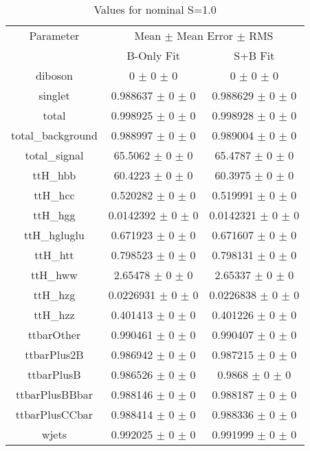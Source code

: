\begin{table}
\centering
\caption{Values for nominal S=1.0}
\begin{tabular}{ccc}
\toprule
Parameter 	& \multicolumn{2}{c}{Mean $\pm$ Mean Error $\pm$ RMS}\\
 	& B-Only Fit & S+B Fit\\
\midrule
diboson 	& \num{0} $\pm$ \num{0} $\pm$ \num{0} 	& \num{0} $\pm$ \num{0} $\pm$ \num{0}\\
singlet 	& \num{0.988637} $\pm$ \num{0} $\pm$ \num{0} 	& \num{0.988629} $\pm$ \num{0} $\pm$ \num{0}\\
total 	& \num{0.998925} $\pm$ \num{0} $\pm$ \num{0} 	& \num{0.998928} $\pm$ \num{0} $\pm$ \num{0}\\
total\_background 	& \num{0.988997} $\pm$ \num{0} $\pm$ \num{0} 	& \num{0.989004} $\pm$ \num{0} $\pm$ \num{0}\\
total\_signal 	& \num{65.5062} $\pm$ \num{0} $\pm$ \num{0} 	& \num{65.4787} $\pm$ \num{0} $\pm$ \num{0}\\
ttH\_hbb 	& \num{60.4223} $\pm$ \num{0} $\pm$ \num{0} 	& \num{60.3975} $\pm$ \num{0} $\pm$ \num{0}\\
ttH\_hcc 	& \num{0.520282} $\pm$ \num{0} $\pm$ \num{0} 	& \num{0.519991} $\pm$ \num{0} $\pm$ \num{0}\\
ttH\_hgg 	& \num{0.0142392} $\pm$ \num{0} $\pm$ \num{0} 	& \num{0.0142321} $\pm$ \num{0} $\pm$ \num{0}\\
ttH\_hgluglu 	& \num{0.671923} $\pm$ \num{0} $\pm$ \num{0} 	& \num{0.671607} $\pm$ \num{0} $\pm$ \num{0}\\
ttH\_htt 	& \num{0.798523} $\pm$ \num{0} $\pm$ \num{0} 	& \num{0.798131} $\pm$ \num{0} $\pm$ \num{0}\\
ttH\_hww 	& \num{2.65478} $\pm$ \num{0} $\pm$ \num{0} 	& \num{2.65337} $\pm$ \num{0} $\pm$ \num{0}\\
ttH\_hzg 	& \num{0.0226931} $\pm$ \num{0} $\pm$ \num{0} 	& \num{0.0226838} $\pm$ \num{0} $\pm$ \num{0}\\
ttH\_hzz 	& \num{0.401413} $\pm$ \num{0} $\pm$ \num{0} 	& \num{0.401226} $\pm$ \num{0} $\pm$ \num{0}\\
ttbarOther 	& \num{0.990461} $\pm$ \num{0} $\pm$ \num{0} 	& \num{0.990407} $\pm$ \num{0} $\pm$ \num{0}\\
ttbarPlus2B 	& \num{0.986942} $\pm$ \num{0} $\pm$ \num{0} 	& \num{0.987215} $\pm$ \num{0} $\pm$ \num{0}\\
ttbarPlusB 	& \num{0.986526} $\pm$ \num{0} $\pm$ \num{0} 	& \num{0.9868} $\pm$ \num{0} $\pm$ \num{0}\\
ttbarPlusBBbar 	& \num{0.988146} $\pm$ \num{0} $\pm$ \num{0} 	& \num{0.988187} $\pm$ \num{0} $\pm$ \num{0}\\
ttbarPlusCCbar 	& \num{0.988414} $\pm$ \num{0} $\pm$ \num{0} 	& \num{0.988336} $\pm$ \num{0} $\pm$ \num{0}\\
wjets 	& \num{0.992025} $\pm$ \num{0} $\pm$ \num{0} 	& \num{0.991999} $\pm$ \num{0} $\pm$ \num{0}\\
\bottomrule
\end{tabular}
\end{table}